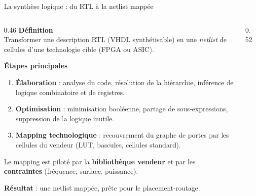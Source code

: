 \begin{frame}{La synthèse logique : du RTL à la netlist mappée}
  \begin{columns}[T,onlytextwidth]

  \begin{column}{0.46\textwidth}
    \small
    \textbf{Définition}\\[2pt]
    Transformer une description RTL (VHDL synthétisable) en une
    \emph{netlist} de cellules d'une technologie cible (FPGA ou ASIC).

    \vspace{6pt}
    \textbf{Étapes principales}
    \begin{enumerate}
      \item \textbf{Élaboration} : analyse du code, résolution de la
            hiérarchie, inférence de logique combinatoire et de registres.
      \item \textbf{Optimisation} : minimisation booléenne, partage de
            sous-expressions, suppression de la logique inutile.
      \item \textbf{Mapping technologique} : recouvrement du graphe de portes
            par les cellules du vendeur (LUT, bascules, cellules standard).
    \end{enumerate}

    \vspace{4pt}
    Le mapping est piloté par la \textbf{bibliothèque vendeur} et par les
    \textbf{contraintes} (fréquence, surface, puissance).

    \vspace{4pt}
    \textbf{Résultat} : une netlist mappée, prête pour le placement-routage.
  \end{column}

  \begin{column}{0.52\textwidth}
    \centering
\end{column}
\end{columns}
\end{frame}
